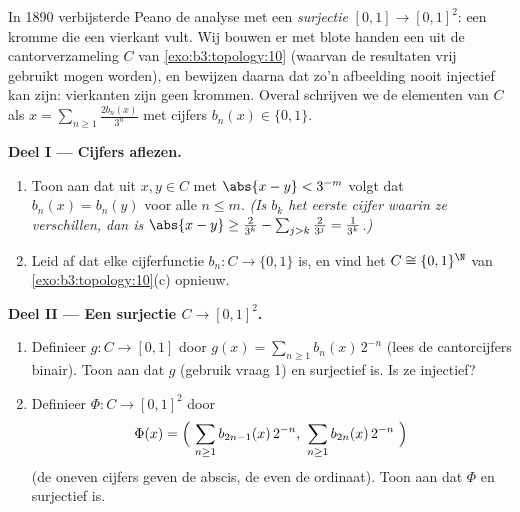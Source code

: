 \begin{problem}\label{pb:b3:topology:1}
In 1890 verbijsterde Peano de analyse met een \emph{
surjectie} $[0,1] \to [0,1]^2$: een kromme die een vierkant vult.
Wij bouwen er met blote handen een uit de cantorverzameling $C$
van \cref{exo:b3:topology:10} (waarvan de resultaten vrij gebruikt
mogen worden), en bewijzen daarna dat zo'n afbeelding nooit
injectief kan zijn: vierkanten zijn geen krommen. Overal schrijven
we de elementen van $C$ als $x = \sum_{n \geq 1}
\frac{2b_n(x)}{3^n}$ met cijfers $b_n(x) \in \{0, 1\}$.

\medskip
\noindent\textbf{Deel I --- Cijfers  aflezen.}
\begin{enumerate}
  \item Toon aan dat uit $x, y \in C$ met $\abs{x - y} < 3^{-m}$
        volgt dat $b_n(x) = b_n(y)$ voor alle $n \leq m$. \emph{(Is
        $b_k$ het eerste cijfer waarin ze verschillen, dan is
        $\abs{x - y} \geq \frac{2}{3^k} - \sum_{j>k}\frac2{3^j} =
        \frac1{3^k}$.)}
  \item Leid af dat elke cijferfunctie $b_n \colon C \to \{0, 1\}$
         is, en vind het  $C \cong
        \{0,1\}^\N$ van \cref{exo:b3:topology:10}(c) opnieuw.
\end{enumerate}

\medskip
\noindent\textbf{Deel II --- Een  surjectie $C \to
[0,1]^2$.}
\begin{enumerate}[resume]
  \item Definieer $g \colon C \to [0,1]$ door $g(x) =
        \sum_{n\geq1} b_n(x)\,2^{-n}$ (lees de cantorcijfers
        binair). Toon aan dat $g$  (gebruik vraag 1) en
        surjectief is. Is ze injectief?
  \item Definieer $\Phi \colon C \to [0,1]^2$ door
        \[
        \Phi(x) = \Bigl(\ \sum_{n\geq1} b_{2n-1}(x)\,2^{-n},\
        \sum_{n\geq1} b_{2n}(x)\,2^{-n}\ \Bigr)
        \]
        (de oneven cijfers geven de abscis, de even de ordinaat).
        Toon aan dat $\Phi$  en surjectief is.
\end{enumerate}


\end{problem}
